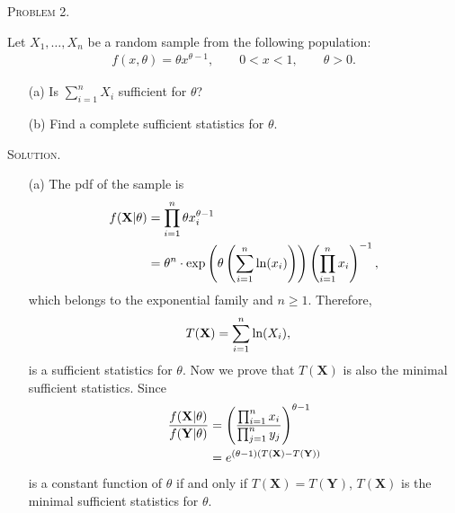 \documentclass{article}
\begin{document}
\begin{CJK}{UTF8}{gbsn}
    \begin{shaded}
        \noindent\textsc{Problem 2.}\par
        Let $X_1,\ldots, X_n$ be a random sample from the following population:
        \begin{align}
            f(x,\theta) = \theta x^{\theta - 1}, \qquad 0 < x < 1, \qquad \theta > 0.
        \end{align}
        \begin{itemize}
            \item [(a)] Is $\sum_{i=1}^n X_i$ sufficient for $\theta$?
            \item [(b)] Find a complete sufficient statistics for $\theta$.
        \end{itemize}
    \end{shaded}
    \noindent\textsc{Solution.}\par
    \begin{itemize}
        \item [(a)]
              The pdf of the sample is
              \begin{align}
                  f(\mathbf{X}|\theta) & = \prod_{i=1}^n \theta x_i^{\theta - 1} \notag                                                                                                       \\
                                       & = \theta^n\cdot \textnormal{exp}\left (\theta \left (\sum_{i=1}^n \textnormal{ln}(x_i)\right )\right ) \left (\prod_{i=1}^n x_i\right )^{-1} ,\notag
              \end{align}
              which belongs to the exponential family and $n\geq 1$.
              Therefore,
              \begin{align}
                  T(\mathbf{X}) & = \sum_{i=1}^n \textnormal{ln}(X_i),\notag
              \end{align}
              is a sufficient statistics for $\theta$.
              Now we prove that $T(\mathbf{X})$ is also the minimal sufficient statistics.
              Since
              \begin{align}
                  \frac{f(\mathbf{X}|\theta)}{f(\mathbf{Y}|\theta)} & = \left ( \frac{\prod_{i=1}^n x_i}{\prod_{j=1}^n y_j} \right )^{\theta - 1}\notag \\
                                                                    & =e^{(\theta - 1)(T(\mathbf{X}) - T(\mathbf{Y}))}\notag
              \end{align}
              is a constant function of $\theta$ if and only if $T(\mathbf{X})=T(\mathbf{Y})$, $T(\mathbf{X})$ is the minimal sufficient statistics for $\theta$.


\end{itemize}
\end{CJK}
\end{document}
